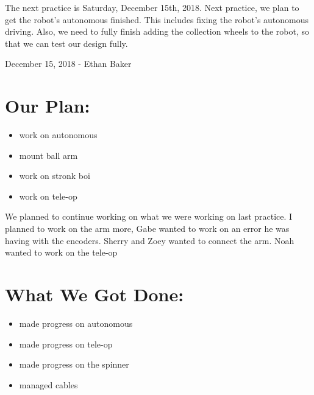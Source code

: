 \documentclass[12pt]{article}
\begin{document}
The next practice is Saturday, December 15th, 2018.
Next practice, we plan to get the robot's autonomous finished. This includes fixing the robot's autonomous driving. Also, we need to fully finish adding the collection wheels to the robot, so that we can test our design fully.

\newpage
\setcounter{section}{0}

December 15, 2018 - Ethan Baker

\section{Our Plan:} %
\begin{itemize}
	\item work on autonomous
\item mount ball arm
\item work on stronk boi
\item work on tele-op
\end{itemize}

We planned to continue working on what we were working on last practice. I planned to work on the arm more, Gabe wanted to work on an error he was having with the encoders. Sherry and Zoey wanted to connect the arm. Noah wanted to work on the tele-op

\section{What We Got Done:} %
\begin{itemize}
	\item made progress on autonomous
\item made progress on tele-op
\item made progress on the spinner
\item managed cables

\end{itemize}
\end{document}
